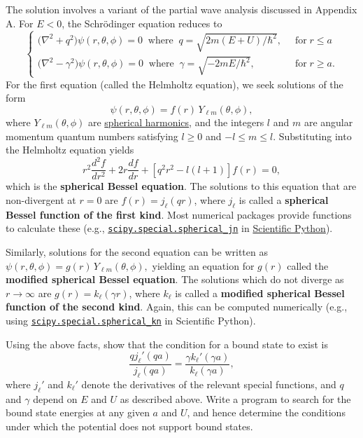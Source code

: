\documentclass[pra,12pt]{revtex4}
\begin{document}
\begin{enumerate}
  The solution involves a variant of the partial wave analysis
  discussed in Appendix A.  For $E < 0$, the Schr\"odinger equation
  reduces to
$$\begin{cases}\Big(\nabla^2 + q^2\Big) \psi(r,\theta,\phi) = 0 \;\;\mathrm{where}\;\; q = \sqrt{2m(E+U)/\hbar^2}, \;\;&\mathrm{for} \; r \le a \\ \Big(\nabla^2 - \gamma^2\Big) \psi(r,\theta,\phi) = 0 \;\;\mathrm{where}\;\; \gamma = \sqrt{-2mE/\hbar^2}, \;\;&\mathrm{for} \; r \ge a. \end{cases}$$
  For the first equation (called the Helmholtz equation), we seek
  solutions of the form
  $$\psi(r,\theta,\phi) = f(r) \, Y_{\ell m}(\theta,\phi),$$
  where $Y_{\ell m}(\theta,\phi)$ are
  \href{https://en.wikipedia.org/wiki/Spherical_harmonics}{spherical
    harmonics}, and the integers $l$ and $m$ are angular momentum
  quantum numbers satisfying $l \ge 0$ and $-l \le m \le l$.
  Substituting into the Helmholtz equation yields
  $$r^2\frac{d^2f}{dr^2} + 2r \frac{df}{dr}+\left[q^2r^2-l(l+1)\right] f(r) = 0,$$
  which is the \textbf{spherical Bessel equation}.  The solutions to
  this equation that are non-divergent at $r = 0$ are $f(r) =
  j_\ell(qr)$, where $j_\ell$ is called a \textbf{spherical Bessel function
    of the first kind}.  Most numerical packages provide functions to
  calculate these (e.g.,
  \href{https://docs.scipy.org/doc/scipy/reference/generated/scipy.special.spherical_jn.html}{\texttt{scipy.special.spherical\_jn}}
  in \href{https://scipy.org/}{Scientific Python}).

  Similarly, solutions for the second equation can be written as
  $\psi(r,\theta,\phi) = g(r) \, Y_{\ell m}(\theta,\phi),$ yielding an
  equation for $g(r)$ called the \textbf{modified spherical Bessel
    equation}.  The solutions which do not diverge as $r\rightarrow
  \infty$ are $g(r) = k_\ell(\gamma r)$, where $k_\ell$ is called a
  \textbf{modified spherical Bessel function of the second kind}.
  Again, this can be computed numerically (e.g., using
  \href{https://docs.scipy.org/doc/scipy/reference/generated/scipy.special.spherical_kn.html#scipy.special.spherical_kn}{\texttt{scipy.special.spherical\_kn}}
  in Scientific Python).

  Using the above facts, show that the condition for a bound state to
  exist is
  $$\frac{qj_\ell'(qa)}{j_\ell(qa)} = \frac{\gamma k_\ell'(\gamma a)}{k_\ell(\gamma a)},$$
  where $j_\ell'$ and $k_\ell'$ denote the derivatives of the relevant
  special functions, and $q$ and $\gamma$ depend on $E$ and $U$ as
  described above.  Write a program to search for the bound state
  energies at any given $a$ and $U$, and hence determine the
  conditions under which the potential does not support bound
  states.
\label{ex:boundstate3d}
\end{enumerate}
\end{document}
